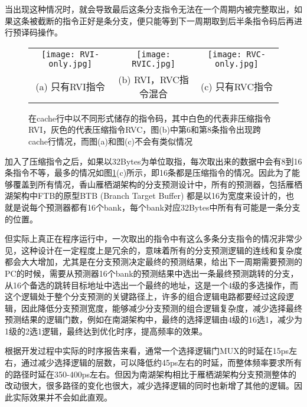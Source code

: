 当出现这种情况时，就会导致最后这条分支指令无法在一个周期内被完整取出，如果这条被截断的指令正好是条分支，便只能等到下一周期取到后半条指令码后再进行预译码操作。

\begin{figure}[htb]
    \centering
    \setlength\tabcolsep{3pt}  %
    \vspace{5pt} %
    \begin{tabular}{ccc}
        \texttt{[image: RVI-only.jpg]} &
        \texttt{[image: RVIC.jpg]} &
        \texttt{[image: RVC-only.jpg]} \\
        (a) 只有RVI指令 & (b) RVI，RVC指令混合 & (c) 只有RVC指令 \\[1ex]
    \end{tabular}
    \caption{在cache行中以不同形式储存的指令码，其中白色的代表非压缩指令RVI，灰色的代表压缩指令RVC，图(b)中第6和第8条指令出现跨cache行情况，而图(a)和图(c)不会有类似情况}
    \label{fig:figure31}
\end{figure}

加入了压缩指令之后，如果以32Bytes为单位取指，每次取出来的数据中会有8到16条指令不等，最多的情况如图\ref{fig:figure31}(c)所示，即16条都是压缩指令的情况。因此为了能够覆盖到所有情况，香山雁栖湖架构的分支预测设计中，所有的预测器，包括雁栖湖架构中FTB的原型BTB (Branch Target Buffer) 都是以16为宽度来设计的，也就是说每个预测器都有16个bank，每个bank对应32Bytes中所有有可能是一条分支的位置。

但实际上真正在程序运行中，一次取出的指令中有这么多条分支指令的情况非常少见，这种设计在一定程度上是冗余的，意味着所有的分支预测逻辑的连线和复杂度都会大大增加，尤其是在分支预测决定最终的预测结果，给出下一周期需要预测的PC的时候，需要从预测器16个bank的预测结果中选出一条最终预测跳转的分支，从16个备选的跳转目标地址中选出一个最终的地址，这是一个4级的多选操作，而这个逻辑处于整个分支预测的关键路径上，许多的组合逻辑电路都要经过这段逻辑，因此降低分支预测宽度，能够减少分支预测的组合逻辑复杂度，减少选择最终预测结果的逻辑门数，例如在南湖架构中，最终的选择逻辑由4级的16选1，减少为1级的2选1逻辑，最终达到优化时序，提高频率的效果。

根据开发过程中实际的时序报告来看，通常一个选择逻辑门MUX的时延在15ps左右，通过减少选择逻辑的层数，可以降低约45ps左右的时延，而整体频率要求所有的路径时延在350-400ps左右。但因为南湖架构相比于雁栖湖架构分支预测整体的改动很大，很多路径的变化也很大，减少选择逻辑的同时也新增了其他的逻辑。因此实际效果并不会如此直观。

